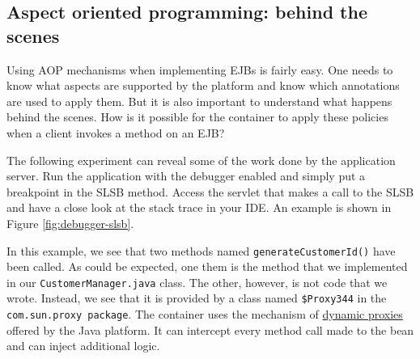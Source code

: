 \subsection{Aspect oriented programming: behind the scenes}

Using \ac{AOP} mechanisms when implementing \ac{EJB}s is fairly easy. One needs to know what aspects are supported by the platform and know which annotations are used to apply them. But it is also important to understand what happens behind the scenes. How is it possible for the container to apply these policies when a client invokes a method on an \ac{EJB}? 

The following experiment can reveal some of the work done by the application server. Run the application with the debugger enabled and simply put a breakpoint in the \ac{SLSB} method. Access the servlet that makes a call to the \ac{SLSB} and have a close look at the stack trace in your IDE. An example is shown in Figure \ref{fig:debugger-slsb}.


In this example, we see that two methods named \texttt{generateCustomerId()} have been called. As could be expected, one them is the method that we implemented in our \texttt{CustomerManager.java} class. The other, however, is not code that we wrote. Instead, we see that it is provided by a class named \texttt{\$Proxy344} in the \texttt{com.sun.proxy package}. The container uses the mechanism of \href{https://docs.oracle.com/javase/8/docs/technotes/guides/reflection/proxy.html}{dynamic proxies} offered by the Java platform. It can intercept every method call made to the bean and can inject additional logic.

